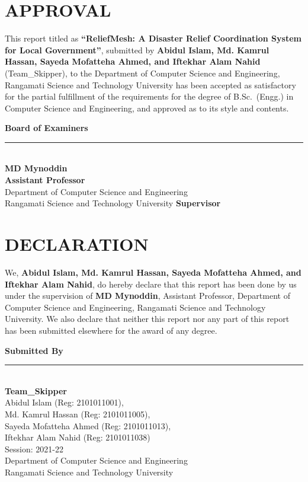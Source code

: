 \documentclass[11pt,a4paper]{report}
\newcommand{\thesistitle}{ReliefMesh: A Disaster Relief Coordination System for Local Government}
\begin{document}
\chapter*{APPROVAL}
\thispagestyle{empty}
This report titled as \textbf{``\thesistitle''}, submitted by \textbf{Abidul Islam, Md. Kamrul Hassan, Sayeda Mofatteha Ahmed, and Iftekhar Alam Nahid} (Team\_Skipper), to the Department of Computer Science and Engineering, Rangamati Science and Technology University has been accepted as satisfactory for the partial fulfillment of the requirements for the degree of B.Sc.\ (Engg.) in Computer Science and Engineering, and approved as to its style and contents.

\vspace{1cm}

\noindent\textbf{Board of Examiners}

\vspace{1cm}

\noindent\rule{6cm}{0.4pt}\\
\textbf{MD Mynoddin}\\
\textbf{Assistant Professor}\\
Department of Computer Science and Engineering\\
Rangamati Science and Technology University \hfill \textbf{Supervisor}

\vspace{1cm}

\chapter*{DECLARATION}
\thispagestyle{empty}

We, \textbf{Abidul Islam, Md. Kamrul Hassan, Sayeda Mofatteha Ahmed, and Iftekhar Alam Nahid}, do hereby declare that this report has been done by us under the supervision of \textbf{MD Mynoddin}, Assistant Professor, Department of Computer Science and Engineering, Rangamati Science and Technology University. We also declare that neither this report nor any part of this report has been submitted elsewhere for the award of any degree.

\vspace{1.5cm}
\noindent\textbf{Submitted By}

\vspace{0.6cm}
\noindent\rule{6cm}{0.4pt}\\
\textbf{Team\_Skipper}\\
Abidul Islam (Reg: 2101011001),\\
Md. Kamrul Hassan (Reg: 2101011005),\\
Sayeda Mofatteha Ahmed (Reg: 2101011013),\\
Iftekhar Alam Nahid (Reg: 2101011038)\\
Session: 2021-22\\
Department of Computer Science and Engineering\\
Rangamati Science and Technology University
\end{document}
